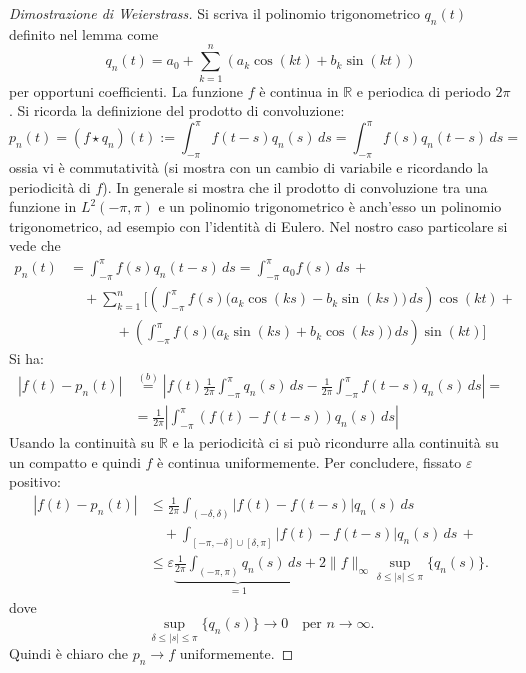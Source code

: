 \begin{proof}[Dimostrazione di Weierstrass]
    Si scriva il polinomio trigonometrico \(q_n(t)\) definito nel lemma come
    \[
        q_n(t) = a_0 + \sum_{k=1}^n (a_k \cos(kt) + b_k \sin (kt))
    \]
    per opportuni coefficienti. La funzione \(f\) è continua in \(\mathbb R\) e
    periodica di periodo \(2\pi\). Si ricorda la definizione del prodotto di
    convoluzione: 
    \[
        p_n(t) = (f \star q_n)(t) := \int_{-\pi}^\pi f(t-s)q_n(s) \, ds = \int_{-\pi}^\pi f(s)q_n(t-s) \, ds = 
    \]
    ossia vi è commutatività (si mostra con un cambio di variabile e ricordando
    la periodicità di \(f\)). In generale si mostra che il prodotto di
    convoluzione tra una funzione in \(L^2(-\pi, \pi)\) e un polinomio
    trigonometrico è anch'esso un polinomio trigonometrico, ad esempio con
    l'identità di Eulero. Nel nostro caso particolare si vede che 
    \[
\begin{aligned}
    p_n{(t)} &= \int_{-\pi}^\pi f(s) q_n(t-s) \, ds = \int_{-\pi}^\pi a_0 f(s) \, ds
    \,+ \, \\
        &\quad + \sum_{k=1}^n \bigg[ 
        \left( \int_{-\pi}^\pi f(s) \big(a_k \cos(ks) - b_k \sin(ks)\big) \, ds \right) \cos(kt)  + \\
        &\quad\quad\quad\, \,  + \left( \int_{-\pi}^\pi f(s) \big(a_k \sin(ks) + b_k \cos(ks)\big) \, ds \right) \sin(kt) 
        \bigg]
\end{aligned}
\]
Si ha: 
\[
\begin{aligned}
    |f(t) -p_n(t) | &\overset{(b)}{=} \left| f(t) \frac{1}{2\pi} \int_{-\pi}^\pi
    q_n(s) \, ds -  \frac{1}{2\pi}\int_{-\pi}^\pi f(t-s)q_n(s) \, ds\right| = \\
                    &= \frac{1}{2\pi} \left| \int_{-\pi}^\pi (f(t) - f(t-s))
                    q_n(s) \, ds \right|
\end{aligned}
\]
Usando la continuità su \(\mathbb R\) e la periodicità ci si può ricondurre alla
continuità su un compatto e quindi \(f\) è continua uniformemente. Per
concludere, fissato \(\varepsilon\) positivo:
\[
\begin{aligned}
    |f(t) - p_n(t)| 
    &\leq \frac{1}{2\pi} \int_{(-\delta, \delta)} |f(t) - f(t-s)| q_n(s) \, ds \\
    &\quad + \int_{[-\pi, -\delta] \cup [\delta, \pi]} |f(t) - f(t-s)| q_n(s) \, ds \, + \\
    &\leq \varepsilon 
    \underbrace{\frac{1}{2\pi} \int_{(-\pi, \pi)} q_n(s) \, ds}_{= 1} 
    + 2 \|f\|_\infty 
    \sup_{\delta \leq |s| \leq \pi} \{q_n(s)\}.
\end{aligned}
\]
dove
\[
\sup_{\delta \leq |s| \leq \pi} \{q_n(s)\} \to 0 \quad \text{per } n \to \infty.
\]
Quindi è chiaro che \(p_n \to f\) uniformemente. 

\end{proof}
